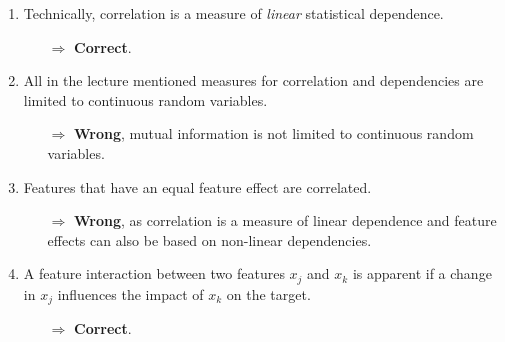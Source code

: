 \begin{enumerate}
        \item Technically, correlation is a measure of \textit{linear} statistical dependence. 
        \begin{itemize}
        	\item[$\Rightarrow$] \textbf{Correct}.
        \end{itemize}
    	\item All in the lecture mentioned measures for correlation and dependencies are limited to continuous random variables.
    	\begin{itemize}
    		\item[$\Rightarrow$] \textbf{Wrong}, mutual information is not limited to continuous random variables.
    	\end{itemize}
        \item Features that have an equal feature effect are correlated. 
        \begin{itemize}
        	\item[$\Rightarrow$] \textbf{Wrong}, as correlation is a measure of linear dependence and feature effects can also be based on non-linear dependencies.
        \end{itemize}
    	\item A feature interaction between two features $x_j$ and $x_k$ is apparent if a change in $x_j$ influences the impact of $x_k$ on the target.
    	\begin{itemize}
    		\item[$\Rightarrow$] \textbf{Correct}.
    	\end{itemize}
	\end{enumerate}
